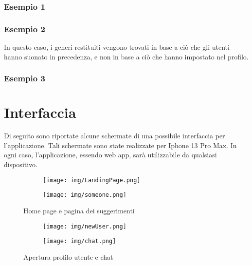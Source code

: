 \documentclass[12pt, a4paper]{article}
\begin{document}
\subsubsection{Esempio 1 }



\subsubsection{Esempio 2 }


In questo caso, i generi restituiti vengono trovati in base a ciò che gli utenti hanno suonato in precedenza, e non in base a ciò che hanno impostato nel profilo.

\subsubsection{Esempio 3 }




\newpage
\section{Interfaccia}

Di seguito sono riportate alcune schermate di una possibile interfaccia per l'applicazione. Tali schermate sono state realizzate per Iphone 13 Pro Max. In ogni caso, l'applicazione, essendo web app, sarà utilizzabile da qualsiasi dispositivo.

\begin{figure}[h]
    \centering
    \begin{subfigure}[b]{0.45\textwidth}
        \texttt{[image: img/LandingPage.png]}
    \end{subfigure}
    \hfill
    \begin{subfigure}[b]{0.45\textwidth}
        \texttt{[image: img/someone.png]}
    \end{subfigure}
    \caption{Home page e pagina dei suggerimenti}
\end{figure}

\begin{figure}[h]
    \centering
    \begin{subfigure}[b]{0.45\textwidth}
        \texttt{[image: img/newUser.png]}
    \end{subfigure}
    \hfill
    \begin{subfigure}[b]{0.45\textwidth}
        \texttt{[image: img/chat.png]}
    \end{subfigure}
    \caption{Apertura profilo utente e chat}
\end{figure}
\end{document}
